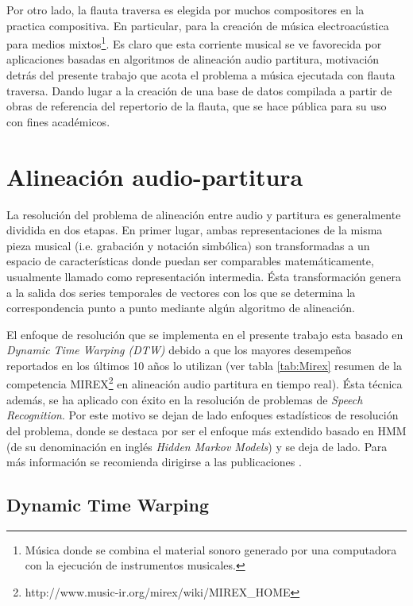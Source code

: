 \documentclass
  [ams,pdfout]%
	{aeslac}
\begin{document}
%
Por otro lado, la flauta traversa es elegida por muchos compositores en la practica compositiva. En particular, para la creación de música electroacústica para medios mixtos\footnote{Música donde se combina el material sonoro generado por una computadora con la ejecución de instrumentos musicales.}. Es claro que esta corriente musical se ve favorecida por aplicaciones basadas en algoritmos de alineación audio partitura, motivación detrás del presente trabajo que acota el problema a música ejecutada con flauta traversa. Dando lugar a la creación de una base de datos compilada a partir de obras de referencia del repertorio de la flauta, que se hace pública para su uso con fines académicos.

%
\section{Alineación audio-partitura}

La resolución del problema de alineación entre audio y partitura es generalmente dividida en dos etapas. En primer lugar, ambas representaciones de la misma pieza musical (i.e. grabación y notación simbólica) son transformadas a un espacio de características donde puedan ser comparables matemáticamente, usualmente llamado como representación intermedia. Ésta transformación genera a la salida dos series temporales de vectores con los que se determina la correspondencia punto a punto mediante algún algoritmo de alineación.

El enfoque de resolución que se implementa en el presente trabajo esta basado en \textit{Dynamic Time Warping (DTW)} debido a que los mayores desempeños reportados en los últimos 10 años lo utilizan (ver tabla \ref{tab:Mirex} resumen de la competencia MIREX\footnote{http://www.music-ir.org/mirex/wiki/MIREX\_HOME} en alineación audio partitura en tiempo real). Ésta técnica además, se ha aplicado con éxito en la resolución de problemas de \textit{Speech Recognition}. Por este motivo se dejan de lado enfoques estadísticos de resolución del problema, donde se destaca por ser el enfoque más extendido basado en HMM (de su denominación en inglés \textit{Hidden Markov Models}) y se deja de lado. Para más información se recomienda dirigirse a las publicaciones \cite{montecchio2009discrete,raphael1999automatic,orio2001score}. 


\subsection{Dynamic Time Warping}
\end{document}

